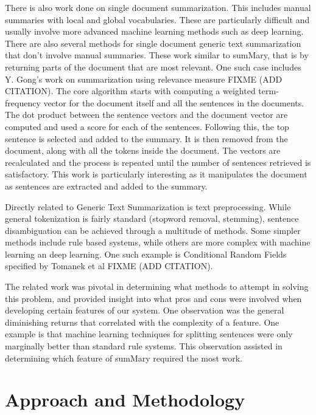 \documentclass[11pt,a4paper]{article}
\begin{document}
There is also work done on single document summarization. This includes manual summaries with local and global vocabularies. These are particularly difficult and usually involve more advanced machine learning methods such as deep learning. There are also several methods for single document generic text summarization that don't involve manual summaries. These work similar to sumMary, that is by returning parts of the document that are most relevant. One such case includes Y. Gong's work on summarization using relevance measure FIXME (ADD CITATION). The core algorithm starts with computing a weighted term-frequency vector for the document itself and all the sentences in the documents. The dot product between the sentence vectors and the document vector are computed and used a score for each of the sentences. Following this, the top sentence is selected and added to the summary. It is then removed from the document, along with all the tokens inside the document. The vectors are recalculated and the process is repeated until the number of sentences retrieved is satisfactory. This work is particularly interesting as it manipulates the document as sentences are extracted and added to the summary.

Directly related to Generic Text Summarization is text preprocessing. While general tokenization is fairly standard (stopword removal, stemming), sentence disambiguation can be achieved through a multitude of methods. Some simpler methods include rule based systems, while others are more complex with machine learning an deep learning. One such example is Conditional Random Fields specified by Tomanek et al FIXME (ADD CITATION).

The related work was pivotal in determining what methods to attempt in solving this problem, and provided insight into what pros and cons were involved when developing certain features of our system. One observation was the general diminishing returns that correlated with the complexity of a feature. One example is that machine learning techniques for splitting sentences were only marginally better than standard rule systems. This observation assisted in determining which feature of sumMary required the most work.

\section{Approach and Methodology}
\end{document}
